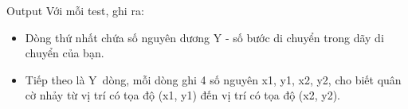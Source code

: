 Output  
Với mỗi test, ghi ra:  
\begin{itemize}
	\item     Dòng thứ nhất chứa số nguyên dương Y - số bước di chuyển trong dãy di chuyển của bạn.   
	\item     Tiếp theo là Y dòng, mỗi dòng ghi 4 số nguyên x1, y1, x2, y2, cho biết quân cờ nhảy từ vị trí có tọa độ (x1, y1) đến vị trí có tọa độ (x2, y2).   
\end{itemize}